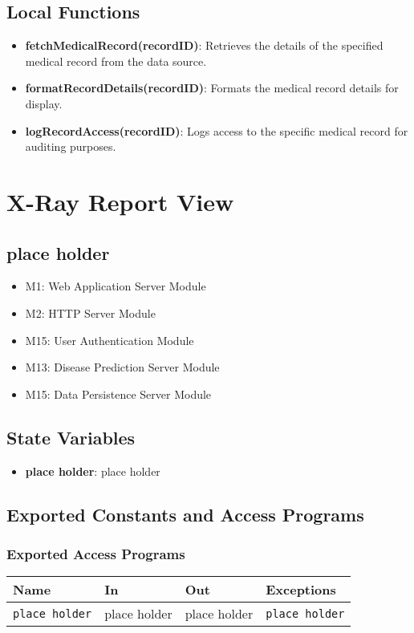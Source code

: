 \documentclass[12pt, titlepage]{article}
\begin{document}
\subsection{Local Functions}
\begin{itemize}
\item \textbf{fetchMedicalRecord(recordID)}: Retrieves the details of the specified medical record from the data source.
\item \textbf{formatRecordDetails(recordID)}: Formats the medical record details for display.
\item \textbf{logRecordAccess(recordID)}: Logs access to the specific medical record for auditing purposes.
\end{itemize}

\section{X-Ray Report View}

\subsection{place holder}
\begin{itemize}
\item M1: Web Application Server Module
\item M2: HTTP Server Module
\item M15: User Authentication Module
\item M13: Disease Prediction Server Module 
\item M15: Data Persistence Server Module
\end{itemize}

\subsection{State Variables}
\begin{itemize}
\item \textbf{place holder}: place holder
\end{itemize}

\subsection{Exported Constants and Access Programs}
\subsubsection{Exported Access Programs}
\begin{tabular}{|l|l|l|l|}
    \hline
    \textbf{Name} & \textbf{In} & \textbf{Out} & \textbf{Exceptions} \\
    \hline 
    \texttt{place holder} & place holder & place holder & \texttt{place holder} \\
    \hline
\end{tabular}
\end{document}
